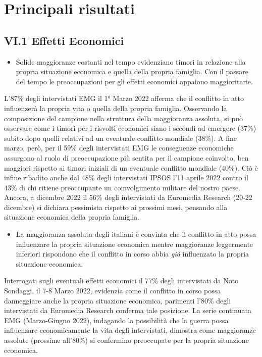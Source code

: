 \documentclass[
  openany]{book}
\providecommand{\tightlist}{%
  \setlength{\itemsep}{0pt}\setlength{\parskip}{0pt}}
\begin{document}
\hypertarget{principali-risultati-4}{%
\section{Principali risultati}\label{principali-risultati-4}}

\hypertarget{vi.1-effetti-economici}{%
\subsection{VI.1 Effetti Economici}\label{vi.1-effetti-economici}}

\begin{itemize}
\tightlist
\item
  Solide maggioranze costanti nel tempo evidenziano timori in relazione alla propria situazione economica e quella della propria famiglia. Con il passare del tempo le preoccupazioni per gli effetti economici appaiono maggioritarie.
\end{itemize}

L'87\% degli intervistati EMG il 1° Marzo 2022 afferma che il conflitto in atto influenzerà la propria vita o quella della propria famiglia. Osservando la composizione del campione nella struttura della maggioranza assoluta, si può osservare come i timori per i risvolti economici siano i secondi ad emergere (37\%) subito dopo quelli relativi ad un eventuale conflitto mondiale (38\%). A fine marzo, però, per il 59\% degli intervistati EMG le conseguenze economiche assurgono al ruolo di preoccupazione più sentita per il campione coinvolto, ben maggiori rispetto ai timori iniziali di un eventuale conflitto mondiale (40\%). Ciò è infine ribadito anche dal 48\% degli intervistati IPSOS l'11 aprile 2022 contro il 43\% di chi ritiene preoccupante un coinvolgimento militare del nostro paese. Ancora, a dicembre 2022 il 56\% degli intervistati da Euromedia Research (20-22 dicembre) si dichiara pessimista rispetto ai prossimi mesi, pensando alla situazione economica della propria famiglia.

\begin{itemize}
\tightlist
\item
  La maggioranza assoluta degli italiani è convinta che il conflitto in atto possa influenzare la propria situazione economica mentre maggioranze leggermente inferiori rispondono che il conflitto in corso abbia \emph{già} influenzato la propria situazione economica.
\end{itemize}

Interrogati sugli eventuali effetti economici il 77\% degli intervistati da Noto Sondaggi, il 7-8 Marzo 2022, evidenzia come il conflitto in corso possa danneggiare anche la propria situazione economica, parimenti l'80\% degli intervistati da Euromedia Research conferma tale posizione. La serie continuata EMG (Marzo-Giugno 2022), indagando la possibilità che la guerra possa influenzare economicamente la vita degli intervistati, dimostra come maggioranze assolute (prossime all'80\%) si confermino preoccupate per la propria situazione economica.
\end{document}
